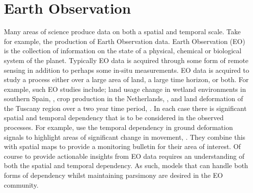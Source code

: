 \section{Earth Observation\label{sec:eo}}
Many areas of science produce data on both a spatial and temporal scale.
Take for example, the production of Earth Observation data. Earth Observation (EO) is the collection of information on the state of a physical, chemical or biological system of the planet.
Typically EO data is acquired through some form of remote sensing in addition to perhaps some in-situ measurements.
EO data is acquired to study a process either over a large area of land, a large time horizon, or both.
For example, such EO studies include; land usage change in wetland environments in southern Spain, \citep{muro_short-term_2016}, crop production in the Netherlands, \citep{khabbazan_crop_2019}, and land deformation of the Tuscany region over a two year time period, \citep{raspini_continuous_2018}.
In each case there is significant spatial and temporal dependency that is to be considered in the observed processes.
For example, \citeauthor{raspini_continuous_2018} use the temporal dependency in ground deformation signals to highlight areas of significant change in movement, \citep{raspini_continuous_2018}.
They combine this with spatial maps to provide a monitoring bulletin for their area of interest.
Of course to provide actionable insights from EO data requires an understanding of both the spatial and temporal dependency.
As such, models that can handle both forms of dependency whilst maintaining parsimony are desired in the EO community. 

